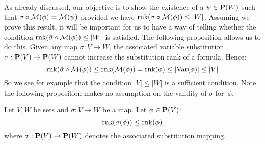 As already discussed, our objective is to show the existence of a
$\psi\in{\bf P}(W)$ such that $\bar{\sigma}\circ{\cal M}(\phi)={\cal
M}(\psi)$ provided we have $\mbox{\rm rnk}(\bar{\sigma}\circ{\cal
M}(\phi))\leq|W|$. Assuming we prove this result, it will be
important for us to have a way of telling whether the condition
$\mbox{\rm rnk}(\bar{\sigma}\circ{\cal M}(\phi))\leq|W|$ is satisfied. The
following proposition allows us to do this. Given any map
$\sigma:V\to W$, the associated variable substitution
$\sigma:\mbox{${\bf P}(V)$}\to{\bf P}(W)$ cannot increase the substitution rank of a
formula. Hence:
    \[
    \mbox{\rm rnk}(\bar{\sigma}\circ{\cal M}(\phi))\leq \mbox{\rm rnk}({\cal
    M}(\phi))=\mbox{\rm rnk}(\phi)\leq|\mbox{\rm Var}(\phi)|\leq|V|
    \]
So we see for example that the condition $|V|\leq|W|$ is a
sufficient condition. Note the following proposition makes no
assumption on the validity of $\sigma$ for~$\phi$.
\begin{prop}\label{logic:prop:FOPL:subst:rank:substitution}
Let $V,W$ be sets and $\sigma:V\to W$ be a map. Let $\phi\in\mbox{${\bf P}(V)$}$:
    \[
    \mbox{\rm rnk}(\sigma(\phi))\leq\mbox{\rm rnk}(\phi)
    \]
where $\sigma:\mbox{${\bf P}(V)$}\to{\bf P}(W)$ denotes the associated substitution
mapping.
\end{prop}
